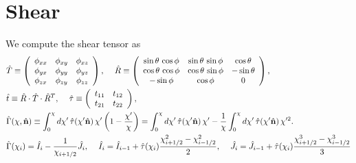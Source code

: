 \documentclass[a4paper,10pt]{article}
\begin{document}
\section{Shear}
  We compute the shear tensor as
  \begin{align}
    &\hat{T}\equiv\left(
    \begin{array}{ccc}
      \phi_{xx}&\phi_{xy}&\phi_{xz}\\
      \phi_{yx}&\phi_{yy}&\phi_{yz}\\
      \phi_{zx}&\phi_{zy}&\phi_{zz}\\
    \end{array}\right),\hspace{12pt} 
    \hat{R}\equiv\left(
    \begin{array}{ccc}
      \sin\theta\,\cos\phi&\sin\theta\,\sin\phi&\cos\theta\\
      \cos\theta\,\cos\phi&\cos\theta\,\sin\phi&-\sin\theta\\
      -\sin\phi           &\cos\phi            &0\\
    \end{array}\right),\\
    &\hat{t}\equiv \hat{R}\cdot\hat{T}\cdot\hat{R}^T,\hspace{12pt}
    \hat{\tau}\equiv\left(
    \begin{array}{cc}
      t_{11}&t_{12}\\
      t_{21}&t_{22}
    \end{array}\right),\\
    &\hat{\Gamma}(\chi,\hat{\bf n})
    \equiv\int_0^\chi d\chi'\,\hat{\tau}(\chi'\hat{\bf n})\,
    \chi'\left(1-\frac{\chi'}{\chi}\right)=
    \int_0^\chi d\chi'\,\hat{\tau}(\chi'\hat{\bf n})\,\chi'-
    \frac{1}{\chi}\int_0^\chi d\chi'\,\hat{\tau}(\chi'\hat{\bf n})\,\chi'^2.\\
    &\hat{\Gamma}(\chi_i)=\hat{I}_{i}-\frac{1}{\chi_{i+1/2}}\hat{J}_{i},\hspace{12pt}
    \hat{I}_{i}=\hat{I}_{i-1}+\hat{\tau}(\chi_i)\frac{\chi_{i+1/2}^2-\chi_{i-1/2}^2}{2},\hspace{12pt}
    \hat{J}_{i}=\hat{J}_{i-1}+\hat{\tau}(\chi_i)\frac{\chi_{i+1/2}^3-\chi_{i-1/2}^3}{3}
  \end{align}
\end{document}
